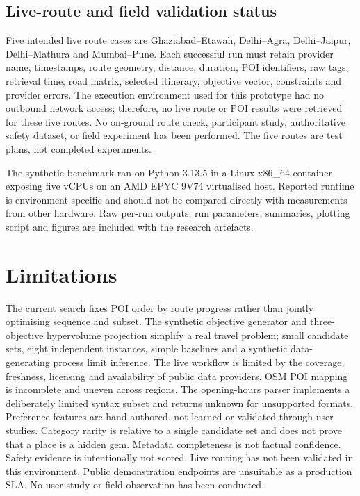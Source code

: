 \documentclass[10pt,conference]{IEEEtran}
\begin{document}
\subsection{Live-route and field validation status}
Five intended live route cases are Ghaziabad--Etawah, Delhi--Agra, Delhi--Jaipur, Delhi--Mathura and Mumbai--Pune. Each successful run must retain provider name, timestamps, route geometry, distance, duration, POI identifiers, raw tags, retrieval time, road matrix, selected itinerary, objective vector, constraints and provider errors. The execution environment used for this prototype had no outbound network access; therefore, no live route or POI results were retrieved for these five routes. No on-ground route check, participant study, authoritative safety dataset, or field experiment has been performed. The five routes are test plans, not completed experiments.

The synthetic benchmark ran on Python 3.13.5 in a Linux x86\_64 container exposing five vCPUs on an AMD EPYC 9V74 virtualised host. Reported runtime is environment-specific and should not be compared directly with measurements from other hardware. Raw per-run outputs, run parameters, summaries, plotting script and figures are included with the research artefacts.

\section{Limitations}
The current search fixes POI order by route progress rather than jointly optimising sequence and subset. The synthetic objective generator and three-objective hypervolume projection simplify a real travel problem; small candidate sets, eight independent instances, simple baselines and a synthetic data-generating process limit inference. The live workflow is limited by the coverage, freshness, licensing and availability of public data providers. OSM POI mapping is incomplete and uneven across regions. The opening-hours parser implements a deliberately limited syntax subset and returns unknown for unsupported formats. Preference features are hand-authored, not learned or validated through user studies. Category rarity is relative to a single candidate set and does not prove that a place is a hidden gem. Metadata completeness is not factual confidence. Safety evidence is intentionally not scored. Live routing has not been validated in this environment. Public demonstration endpoints are unsuitable as a production SLA. No user study or field observation has been conducted.
\end{document}

